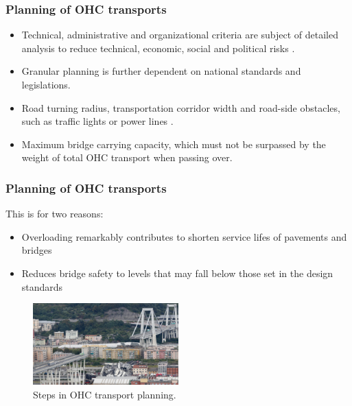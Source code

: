 \documentclass{beamer}   %
\newcommand{\RNum}[1]{\uppercase\expandafter{\romannumeral #1\relax}}
\theoremstyle{break}
\begin{document}
  \begin{frame}
    \frametitle{Planning of OHC transports  \RNum{1}}
    \begin{itemize}
      \item Technical, administrative and organizational criteria are subject of detailed analysis to reduce technical, economic, social and political risks \cite{Palsaitis.2012}.
      \item Granular planning is further dependent on national standards and legislations.
      \item Road turning radius, transportation corridor width and road-side obstacles, such as traffic lights or power lines \cite{PETRASKA.2018}.
      \item Maximum bridge carrying capacity, which must not be surpassed by the weight of total OHC transport when passing over.
    \end{itemize}
  \end{frame}

  \begin{frame}
    \frametitle{Planning of OHC transports  \RNum{2}}
    This is for two reasons:
    \begin{itemize}
      \item Overloading remarkably contributes to shorten service lifes of pavements and bridges
      \item Reduces bridge safety to levels that may fall below those set in the design standards \cite{fiorillo2018fragility}
    \end{itemize}
    \begin{figure}[!ht]
      \centering
      \includegraphics[width=0.5\textwidth]{../manuscript/figures/Collaps.jpg}
      \caption{Steps in OHC transport planning.}
      \label{fig:higher level}
    \end{figure}
  \end{frame}
\end{document}
